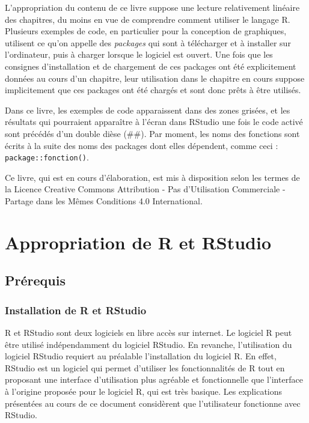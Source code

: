 \documentclass[
  letterpaper,
]{book}
\begin{document}
L'appropriation du contenu de ce livre suppose une lecture relativement
linéaire des chapitres, du moins en vue de comprendre comment utiliser
le langage R. Plusieurs exemples de code, en particulier pour la
conception de graphiques, utilisent ce qu'on appelle des \emph{packages}
qui sont à télécharger et à installer sur l'ordinateur, puis à charger
lorsque le logiciel est ouvert. Une fois que les consignes
d'installation et de chargement de ces packages ont été explicitement
données au cours d'un chapitre, leur utilisation dans le chapitre en
cours suppose implicitement que ces packages ont été chargés et sont
donc prêts à être utilisés.

Dans ce livre, les exemples de code apparaissent dans des zones grisées,
et les résultats qui pourraient apparaître à l'écran dans RStudio une
fois le code activé sont précédés d'un double dièse (\#\#). Par moment,
les noms des fonctions sont écrits à la suite des noms des packages dont
elles dépendent, comme ceci : \texttt{package::fonction()}.

Ce livre, qui est en cours d'élaboration, est mis à disposition selon
les termes de la Licence Creative Commons Attribution - Pas
d'Utilisation Commerciale - Partage dans les Mêmes Conditions 4.0
International.

\renewcommand{\partname}{Partie}

\part{Appropriation de R et RStudio}

\chapter{Prérequis}\label{pruxe9requis}

\section{Installation de R et
RStudio}\label{installation-de-r-et-rstudio}

R et RStudio sont deux logiciels en libre accès sur internet. Le
logiciel R peut être utilisé indépendamment du logiciel RStudio. En
revanche, l'utilisation du logiciel RStudio requiert au préalable
l'installation du logiciel R. En effet, RStudio est un logiciel qui
permet d'utiliser les fonctionnalités de R tout en proposant une
interface d'utilisation plus agréable et fonctionnelle que l'interface à
l'origine proposée pour le logiciel R, qui est très basique. Les
explications présentées au cours de ce document considèrent que
l'utilisateur fonctionne avec RStudio.
\end{document}
